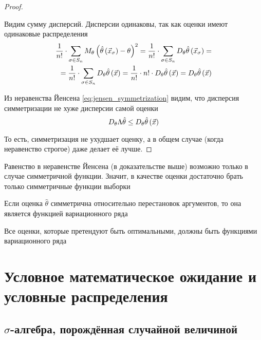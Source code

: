 \begin{proof}
\begin{enumerate}
    Видим сумму дисперсий.
    Дисперсии одинаковы, так как оценки имеют одинаковые распределения
    \begin{align*}
        \frac{1}{n!}\cdot\sum_{\sigma\in S_n}
            M_{\theta} \left(\hat{\theta}\left(\vec{x}_\sigma\right)
            -\theta\right)^2
        =\frac{1}{n!}\cdot\sum_{\sigma\in S_n}
            D_{\theta} \hat{\theta}\left(\vec{x}_\sigma\right)=\\
        =\frac{1}{n!}\cdot\sum_{\sigma\in S_n}
            D_{\theta} \hat{\theta}\left(\vec{x}\right)
        =\frac{1}{n!}\cdot n!
            \cdot D_{\theta} \hat{\theta}\left(\vec{x}\right)
        =D_{\theta} \hat{\theta}\left(\vec{x}\right)
    \end{align*}

    Из неравенства Йенсена \eqref{eq:jensen_symmetrization} видим,
    что дисперсия симметризации не хуже дисперсии самой оценки
    $$D_{\theta} \Lambda\hat{\theta}
        \le D_{\theta} \hat{\theta}\left({\vec{x}}\right)$$

    \end{enumerate}

    То есть, симметризация не ухудшает оценку,
    а в общем случае (когда неравенство строгое) даже делает её лучше.
\end{proof}

\begin{remark}
    Равенство в неравенстве Йенсена (в доказательстве выше)
    возможно только в случае симметричной функции.
    Значит,
    в качестве оценки достаточно брать только симметричные функции выборки
\end{remark}
\begin{definition}
    Если оценка $\hat{\theta}$ симметрична относительно перестановок аргументов,
    то она является функцией вариационного ряда
\end{definition}
\begin{remark}
    Все оценки, которые претендуют быть оптимальными,
    должны быть функциями вариационного ряда
\end{remark}
\section{Условное математическое ожидание и условные распределения}
\subsection{$\sigma$-алгебра, порождённая случайной величиной}

